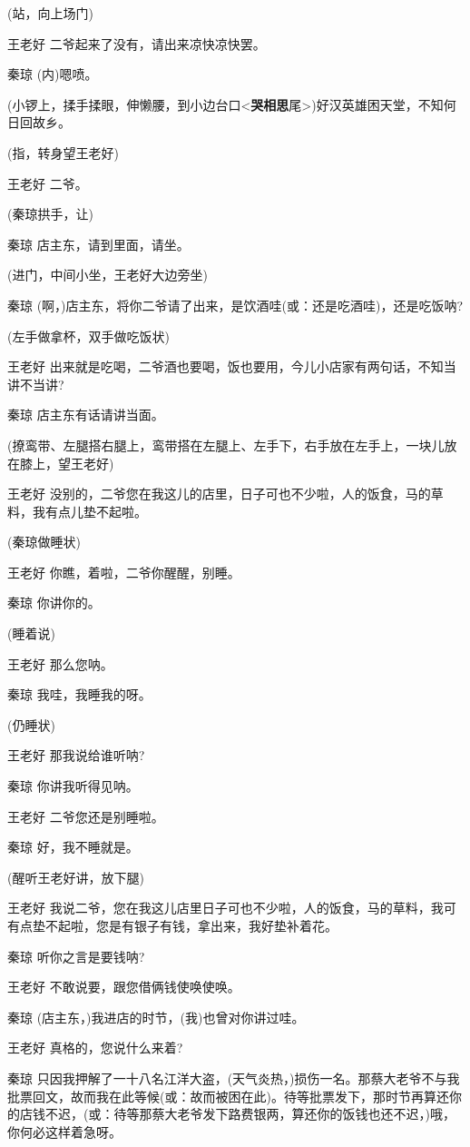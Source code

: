 (站，向上场门)

王老好 二爷起来了没有，请出来凉快凉快罢。

秦琼 (内)嗯喷。

(小锣上，揉手揉眼，伸懒腰，到小边台口\textless{}\textbf{哭相思}尾\textgreater{})好汉英雄困天堂，不知何日回故乡。

(指，转身望王老好)

王老好 二爷。

(秦琼拱手，让)

秦琼 店主东，请到里面，请坐。

(进门，中间小坐，王老好大边旁坐)

秦琼
(啊，)店主东，将你二爷请了出来，是饮酒哇(或：还是吃酒哇)，还是吃饭呐?

(左手做拿杯，双手做吃饭状)

王老好
出来就是吃喝，二爷酒也要喝，饭也要用，今儿小店家有两句话，不知当讲不当讲?

秦琼 店主东有话请讲当面。

(撩鸾带、左腿搭右腿上，鸾带搭在左腿上、左手下，右手放在左手上，一块儿放在膝上，望王老好)

王老好
没别的，二爷您在我这儿的店里，日子可也不少啦，人的饭食，马的草料，我有点儿垫不起啦。

(秦琼做睡状)

王老好 你瞧，着啦，二爷你醒醒，别睡。

秦琼 你讲你的。

(睡着说)

王老好 那么您呐。

秦琼 我哇，我睡我的呀。

(仍睡状)

王老好 那我说给谁听呐?

秦琼 你讲我听得见呐。

王老好 二爷您还是别睡啦。

秦琼 好，我不睡就是。

(醒听王老好讲，放下腿)

王老好
我说二爷，您在我这儿店里日子可也不少啦，人的饭食，马的草料，我可有点垫不起啦，您是有银子有钱，拿出来，我好垫补着花。

秦琼 听你之言是要钱呐?

王老好 不敢说要，跟您借俩钱使唤使唤。

秦琼 (店主东，)我进店的时节，(我)也曾对你讲过哇。

王老好 真格的，您说什么来着?

秦琼
只因我押解了一十八名江洋大盗，(天气炎热，)损伤一名。那蔡大老爷不与我批票回文，故而我在此等候(或：故而被困在此)。待等批票发下，那时节再算还你的店钱不迟，(或：待等那蔡大老爷发下路费银两，算还你的饭钱也还不迟，)哦，你何必这样着急呀。

